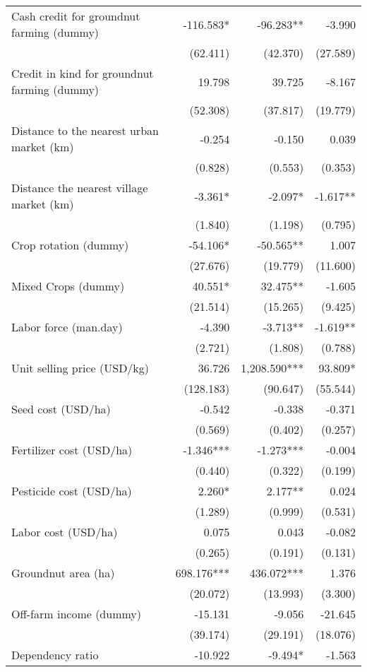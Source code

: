 \documentclass[
]{article}
\begin{document}
\begin{longtable}[t]{lrrr}
\addlinespace
Cash credit for groundnut farming (dummy) & -116.583* & -96.283** & -3.990\\
 & (62.411) & (42.370) & (27.589)\\
Credit in kind for groundnut farming (dummy) & 19.798 & 39.725 & -8.167\\
 & (52.308) & (37.817) & (19.779)\\
Distance to the nearest urban market (km) & -0.254 & -0.150 & 0.039\\
\addlinespace
 & (0.828) & (0.553) & (0.353)\\
Distance the nearest village market (km) & -3.361* & -2.097* & -1.617**\\
 & (1.840) & (1.198) & (0.795)\\
Crop rotation (dummy) & -54.106* & -50.565** & 1.007\\
 & (27.676) & (19.779) & (11.600)\\
\addlinespace
Mixed Crops (dummy) & 40.551* & 32.475** & -1.605\\
 & (21.514) & (15.265) & (9.425)\\
Labor force (man.day) & -4.390 & -3.713** & -1.619**\\
 & (2.721) & (1.808) & (0.788)\\
Unit selling price (USD/kg) & 36.726 & 1,208.590*** & 93.809*\\
\addlinespace
 & (128.183) & (90.647) & (55.544)\\
Seed cost (USD/ha) & -0.542 & -0.338 & -0.371\\
 & (0.569) & (0.402) & (0.257)\\
Fertilizer cost (USD/ha) & -1.346*** & -1.273*** & -0.004\\
 & (0.440) & (0.322) & (0.199)\\
\addlinespace
Pesticide cost (USD/ha) & 2.260* & 2.177** & 0.024\\
 & (1.289) & (0.999) & (0.531)\\
Labor cost (USD/ha) & 0.075 & 0.043 & -0.082\\
 & (0.265) & (0.191) & (0.131)\\
Groundnut area (ha) & 698.176*** & 436.072*** & 1.376\\
\addlinespace
 & (20.072) & (13.993) & (3.300)\\
Off-farm income (dummy) & -15.131 & -9.056 & -21.645\\
 & (39.174) & (29.191) & (18.076)\\
Dependency ratio & -10.922 & -9.494* & -1.563\\

\end{longtable}
\end{document}
